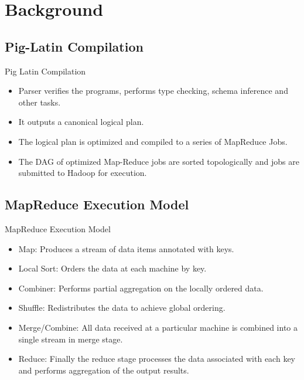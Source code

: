 \section{Background}

\subsection{Pig-Latin Compilation}
\begin{frame}{Pig Latin Compilation}
\begin{itemize}
	\item Parser verifies the programs, performs type checking, schema inference
          and other tasks.
	\item It outputs a canonical logical plan.
	\item The logical plan is optimized and compiled to a series of MapReduce
          Jobs.
	\item The DAG of optimized Map-Reduce jobs are sorted topologically and jobs
          are submitted to Hadoop for execution.
\end{itemize}
\end{frame}

\subsection{MapReduce Execution Model}
\begin{frame}{MapReduce Execution Model}
\begin{itemize}
	\item Map: Produces a stream of data items annotated with keys.
	\item Local Sort: Orders the data at each machine by key.
	\item Combiner: Performs partial aggregation on the locally ordered data.
	\item Shuffle: Redistributes the data to achieve global ordering.
	\item Merge/Combine: All data received at a particular machine is combined
          into a single stream in merge stage.
	\item Reduce: Finally the reduce stage processes the data associated with
          each key and performs aggregation of the output results.
\end{itemize}
\end{frame}

